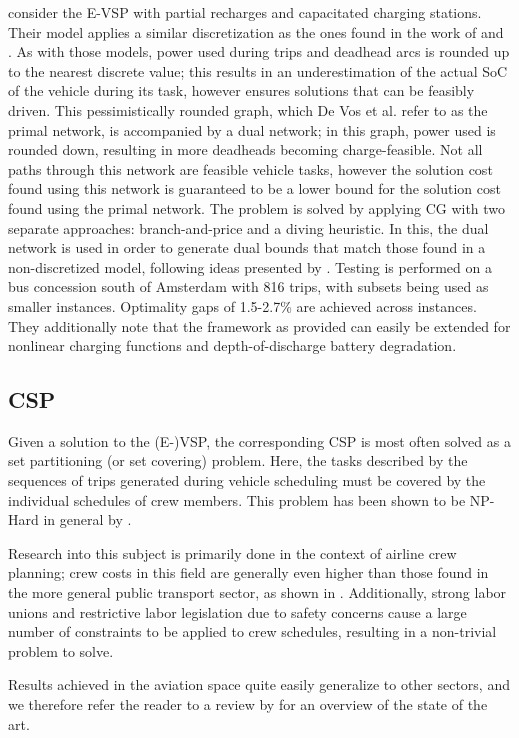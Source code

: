 \documentclass[]{article}
\begin{document}
 consider the E-VSP with partial recharges and capacitated charging stations. Their model applies a similar discretization as the ones found in the work of \citet{vanKootenNiekerk2017} and \citet{Zhang2021}. As with those models, power used during trips and deadhead arcs is rounded up to the nearest discrete value; this results in an underestimation of the actual SoC of the vehicle during its task, however ensures solutions that can be feasibly driven. This pessimistically rounded graph, which De Vos et al. refer to as the primal network, is accompanied by a dual network; in this graph, power used is rounded down, resulting in more deadheads becoming charge-feasible. Not all paths through this network are feasible vehicle tasks, however the solution cost found using this network is guaranteed to be a lower bound for the solution cost found using the primal network. The problem is solved by applying CG with two separate approaches: branch-and-price and a diving heuristic. In this, the dual network is used in order to generate dual bounds that match those found in a non-discretized model, following ideas presented by \citet{Boland2017}. Testing is performed on a bus concession south of Amsterdam with 816 trips, with subsets being used as smaller instances. Optimality gaps of 1.5-2.7\% are achieved across instances. They additionally note that the framework as provided can easily be extended for nonlinear charging functions and depth-of-discharge battery degradation. 

\subsection{CSP}
Given a solution to the (E-)VSP, the corresponding CSP is most often solved as a set partitioning (or set covering) problem. Here, the tasks described by the sequences of trips generated during vehicle scheduling must be covered by the individual schedules of crew members. This problem has been shown to be NP-Hard in general by \citet{Fischetti1989}.

Research into this subject is primarily done in the context of airline crew planning; crew costs in this field are generally even higher than those found in the more general public transport sector, as shown in \citet{Barnhart2003}. Additionally, strong labor unions and restrictive labor legislation due to safety concerns cause a large number of constraints to be applied to crew schedules, resulting in a non-trivial problem to solve.

Results achieved in the aviation space quite easily generalize to other sectors, and we therefore refer the reader to a review by \citet{Wen2021} for an overview of the state of the art. 
\end{document}
